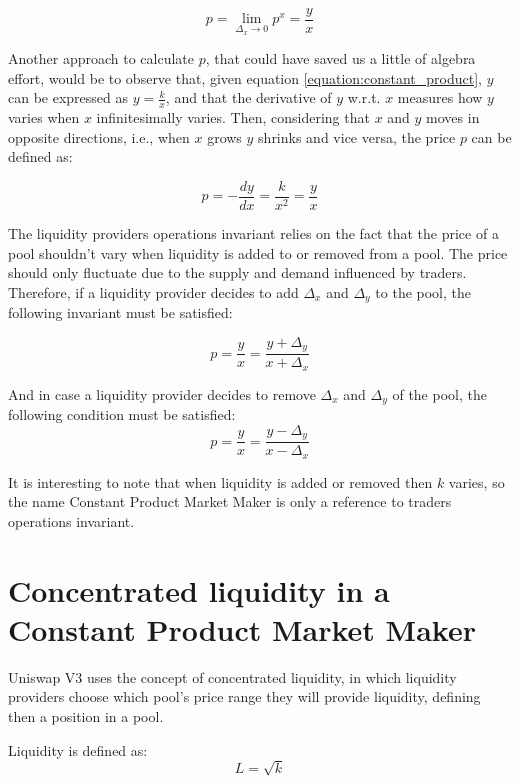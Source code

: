 \documentclass{article}
\begin{document}
\begin{equation}
    \label{equation:price}
    p=\lim_{\Delta_x \to 0}p^x=\frac{y}{x}
\end{equation}

Another approach to calculate $p$, that could have saved us a little of algebra effort, would be to observe that, given equation \ref{equation:constant_product}, $y$ can be expressed as $y=\frac{k}{x}$, and that the derivative of $y$ w.r.t. $x$ measures how $y$ varies when $x$ infinitesimally varies.
Then, considering that $x$ and $y$ moves in opposite directions, i.e., when $x$ grows $y$ shrinks and vice versa, the price $p$ can be defined as:

\begin{equation}
    p=-\frac{dy}{dx}=\frac{k}{x^2}=\frac{y}{x}
\end{equation}

The liquidity providers operations invariant relies on the fact that the price of a pool shouldn't vary when liquidity is added to or removed from a pool.
The price should only fluctuate due to the supply and demand influenced by traders.
Therefore, if a liquidity provider decides to add $\Delta_x$ and $\Delta_y$ to the pool, the following invariant must be satisfied:

\begin{equation}
    p=\frac{y}{x}=\frac{y+\Delta_y}{x+\Delta_x}
\end{equation}

And in case a liquidity provider decides to remove $\Delta_x$ and $\Delta_y$ of the pool, the following condition must be satisfied:
\begin{equation}
    p=\frac{y}{x}=\frac{y-\Delta_y}{x-\Delta_x}
\end{equation}

It is interesting to note that when liquidity is added or removed then $k$ varies, so the name Constant Product Market Maker is only a reference to traders operations invariant.

\section{Concentrated liquidity in a Constant Product Market Maker}

Uniswap V3 uses the concept of concentrated liquidity, in which liquidity providers choose which pool's price range they will provide liquidity, defining then a position in a pool.

Liquidity is defined as:
\begin{equation}
    L=\sqrt{k}
\end{equation}
\end{document}
